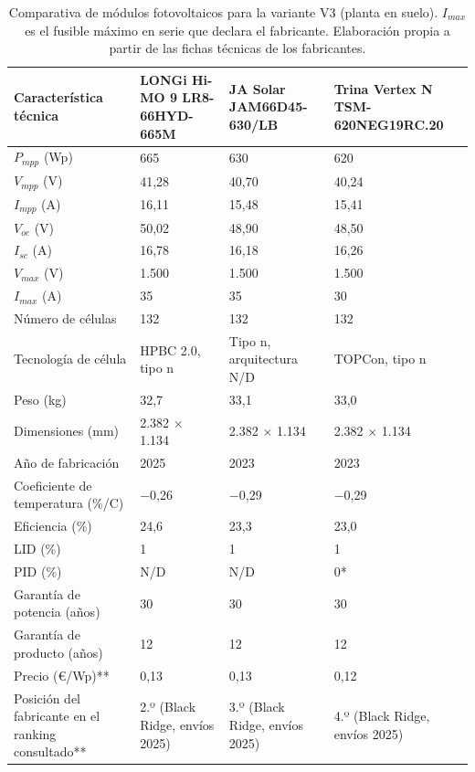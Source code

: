 \begin{table}[htbp]
    \centering
    \caption{Comparativa de módulos fotovoltaicos para la variante V3 (planta en suelo). $I_{max}$ es el fusible máximo en serie que declara el fabricante. Elaboración propia a partir de las fichas técnicas de los fabricantes.}
    \label{tab:diseno-modulos-v3}
    \footnotesize
    \renewcommand{\arraystretch}{1.15}
    \begin{tabularx}{\textwidth}{|F{4.2cm}|Y|Y|Y|}
        \hline
        \textbf{Característica técnica} & \textbf{LONGi Hi-MO 9 LR8-66HYD-665M} & \textbf{JA Solar JAM66D45-630/LB} & \textbf{Trina Vertex N TSM-620NEG19RC.20} \\
        \hline
        $P_{mpp}$ (Wp) & 665 & 630 & 620 \\
        \hline
        $V_{mpp}$ (V) & 41,28 & 40,70 & 40,24 \\
        \hline
        $I_{mpp}$ (A) & 16,11 & 15,48 & 15,41 \\
        \hline
        $V_{oc}$ (V) & 50,02 & 48,90 & 48,50 \\
        \hline
        $I_{sc}$ (A) & 16,78 & 16,18 & 16,26 \\
        \hline
        $V_{max}$ (V) & 1.500 & 1.500 & 1.500 \\
        \hline
        $I_{max}$ (A) & 35 & 35 & 30 \\
        \hline
        Número de células & 132 & 132 & 132 \\
        \hline
        Tecnología de célula & HPBC 2.0, tipo n & Tipo n, arquitectura N/D & TOPCon, tipo n \\
        \hline
        Peso (kg) & 32,7 & 33,1 & 33,0 \\
        \hline
        Dimensiones (mm) & 2.382 × 1.134 & 2.382 × 1.134 & 2.382 × 1.134 \\
        \hline
        Año de fabricación & 2025 & 2023 & 2023 \\
        \hline
        Coeficiente de temperatura (\%/\textdegree{}C) & $-$0,26 & $-$0,29 & $-$0,29 \\
        \hline
        Eficiencia (\%) & 24,6 & 23,3 & 23,0 \\
        \hline
        \acs{LID} (\%) & 1 & 1 & 1 \\
        \hline
        PID (\%) & N/D & N/D & 0* \\
        \hline
        Garantía de potencia (años) & 30 & 30 & 30 \\
        \hline
        Garantía de producto (años) & 12 & 12 & 12 \\
        \hline
        Precio (€/Wp)** & 0,13 & 0,13 & 0,12 \\
        \hline
        Posición del fabricante en el ranking consultado** & 2.º (Black Ridge, envíos 2025) & 3.º (Black Ridge, envíos 2025) & 4.º (Black Ridge, envíos 2025) \\
        \hline
    \end{tabularx}


\end{table}
